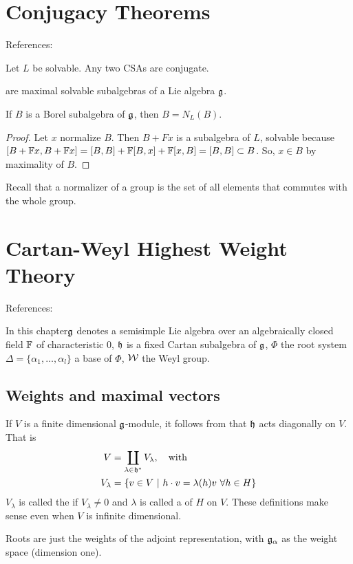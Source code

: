\chapter{Conjugacy Theorems}
\label{cha:conjugacy_theorems}

References: \cite[$\S 16$]{humphreys1972introduction}

\begin{theorem}
    Let $L$ be solvable. Any two CSAs are conjugate.
\end{theorem}

 are maximal solvable subalgebras of a Lie algebra $\mathfrak{g}$.
\begin{lemma}
    If $B$  is a Borel subalgebra of $\mathfrak{g}$, then $B=N_L(B)$.
\end{lemma}
\begin{proof}
    Let $x$ normalize $B$. Then $B + Fx$ is a subalgebra of $L$, solvable because $[B + \mathbb{F} x, B + \mathbb{F} x] = [B,B] + \mathbb{F} [B,x] + \mathbb{F} [x,B] = [B,B] \subset B$. So, $x\in B$ by maximality of $B$.
\end{proof}
\begin{insight}
    Recall that a normalizer of a group is the set of all elements that commutes with the whole group.
\end{insight}


\chapter{Cartan-Weyl Highest Weight Theory}
\label{cha:cartan_weyl_highest_weight_theory}
References: \cite[$\S 20$]{humphreys1972introduction}

In this chapter$\mathfrak{g}$ denotes a semisimple Lie algebra over an algebraically closed field $\mathbb{F}$ of characteristic $0$, $\mathfrak{h}$ is a fixed Cartan subalgebra of $\mathfrak{g}$, $\Phi$ the root system $\Delta = \{\alpha_1,\dotsc,\alpha_l\}$ a base of $\Phi$, $\mathcal{W}$ the Weyl group.

\section{Weights and maximal vectors}
\label{sec:weights_and_maximal_vectors}

If $V$ is a finite dimensional $\mathfrak{g}$-module, it follows from   that $\mathfrak{h}$ acts diagonally on $V$. That is 
\begin{align}
    V &= \coprod_{\lambda\in \mathfrak{h}^* } V_\lambda, \quad \text{with}\\
    V_\lambda &= \{v\in V\ |\ h\cdot v = \lambda(h) v \ \forall h\in H\}
\end{align}
$V_\lambda$ is called the  if $V_\lambda\neq 0$ and $\lambda$ is called a  of $H$ on $V$. 
These definitions make sense even when $V$ is infinite dimensional.
\begin{insight}
    Roots are just the weights of the adjoint representation, with $\mathfrak{g}_\alpha$  as the weight space (dimension one).
\end{insight}

